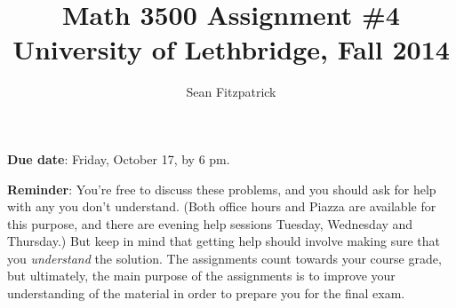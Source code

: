 \documentclass[letterpaper,12pt]{article}
\title{Math 3500 Assignment \#4\\University of Lethbridge, Fall 2014}
\author{Sean Fitzpatrick}
\begin{document}
 \maketitle

{\bf Due date}: Friday, October 17, by 6 pm.

\bigskip

{\bf Reminder}: You're free to discuss these problems, and you should ask for help with any you don't understand. (Both office hours and Piazza are available for this purpose, and there are evening help sessions Tuesday, Wednesday and Thursday.) But keep in mind that getting help should involve making sure that you {\em understand} the solution. The assignments count towards your course grade, but ultimately, the main purpose of the assignments is to improve your understanding of the material in order to prepare you for the final exam.
\end{document}
